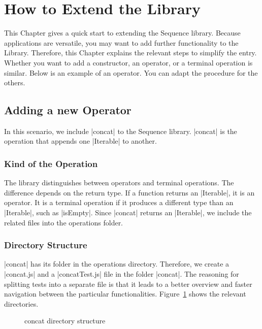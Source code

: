 \section{How to Extend the Library}
\label{sec:How to Extend the Library}
This Chapter gives a quick start to extending the Sequence library. Because
applications are versatile, you may want to add further functionality to the
Library. Therefore, this Chapter explains the relevant steps to simplify the entry.
\newline
Whether you want to add a constructor, an operator, or a terminal operation is
similar. Below is an example of an operator. You can adapt the procedure for
the others.

\subsection{Adding a new Operator}
\label{sub:Adding a new Operator}
In this scenario, we include |concat| to the Sequence library. |concat| is the
operation that appends one |Iterable| to another.

\subsubsection{Kind of the Operation}
\label{subsub:Kind of the Operation}
The library distinguishes between operators and terminal operations. The
difference depends on the return type. If a function returns an |Iterable|, it
is an operator. It is a terminal operation if it produces a different type than an
|Iterable|, such as |isEmpty|.
Since |concat| returns an |Iterable|, we include the related files into the
operations folder.

\subsubsection{Directory Structure}
\label{subsub:Directory Structure}
|concat| has its folder in the operations directory. Therefore, we create a
|concat.js| and a |concatTest.js| file in the folder |concat|. The reasoning for 
splitting tests into a separate file is that it leads to a better overview and faster
navigation between the particular functionalities. Figure~\ref{fig:concat_dir}
shows the relevant directories.

\begin{figure}[H]
  \caption{concat directory structure}
  \label{fig:concat_dir}
\end{figure}

